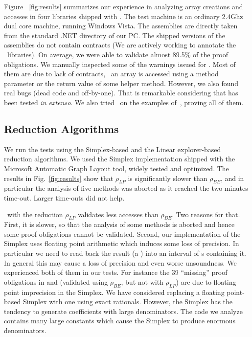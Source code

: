 \documentclass[sttt]{svjour}
\begin{document}
Figure ~\ref{fig:results} summarizes our experience in analyzing array creations and accesses in four libraries shipped with \NET.
The test machine is an ordinary 2.4Ghz dual core machine, running Windows Vista.
The assemblies are directly taken from the standard .NET directory of our PC.
The shipped versions of the assemblies do not contain contracts (We are actively working to annotate the \NET\ libraries). 
On average, we were able to validate almost 89.5\% of the proof obligations. 
We manually inspected some of the warnings issued for . 
Most of them are due to lack of contracts, \eg\ an array is accessed using a method parameter or the return value of some helper method.
However, we also found real bugs (dead code and off-by-one). 
That is remarkable considering that  has been tested \emph{in extenso}.
We also tried \Subpoly\ on the examples of~\cite{CousotHalbwachs78,SankaranarayananEtAl07,GulavaniEtAl08}, proving all of them.

\subsection{Reduction Algorithms}
We run the tests using the Simplex-based and the Linear explorer-based reduction algorithms.
We used the Simplex implementation shipped with the Microsoft Automatic Graph Layout tool, widely tested and optimized.
The results in Fig.~\ref{fig:results} show that $\rho_{LP}$ is significantly slower than  $\rho_{BE}$, and in particular the analysis of five methods was aborted as it reached the two minutes time-out.
Larger time-outs did not help.

\Subpoly\ with the reduction  $\rho_{LP}$ validates less accesses than $\rho_{BE}$.
Two reasons for that.
First, it is slower, so that the analysis of some methods is aborted and hence some proof obligations cannot be validated.
Second, our implementation of the Simplex uses floating point arithmetic which induces some loss of precision. 
In particular we need to read back the result (a ) into an interval of s containing it.
In general this may cause a loss of precision and even worse unsoundness.
We experienced both of them in our tests.
For instance the 39 ``missing''   proof obligations in  and  (validated using $\rho_{BE}$, but not  with $\rho_{LP}$) 
are  due to floating point imprecision in the Simplex.
We have considered replacing a floating point-based Simplex with one using exact rationals.
However,  the Simplex has the tendency to generate coefficients with large denominators.
The code we analyze contains many large constants which cause the Simplex to produce enormous denominators.
\end{document}
